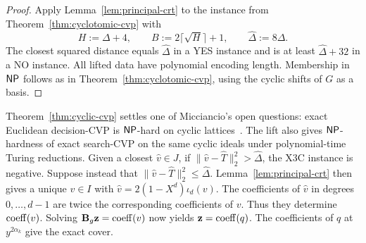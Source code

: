 \begin{proof}
Apply Lemma~\ref{lem:principal-crt} to the instance from
Theorem~\ref{thm:cyclotomic-cvp} with
\[
 H:=\Delta+4,
 \qquad
 B:=2\lceil\sqrt H\rceil+1,
 \qquad
 \widehat\Delta:=8\Delta.
\]
The closest squared distance equals \(\widehat\Delta\) in a YES instance and
is at least \(\widehat\Delta+32\) in a NO instance.  All lifted data have
polynomial encoding length.
Membership in \(\mathsf{NP}\) follows as in
Theorem~\ref{thm:cyclotomic-cvp}, using the cyclic shifts of \(G\) as a
basis.
\end{proof}

\begin{remark}
Theorem~\ref{thm:cyclic-cvp} settles one of Micciancio's open questions:
exact Euclidean decision-CVP is \(\mathsf{NP}\)-hard on cyclic
lattices~\cite{Micciancio2007}.
The lift also gives \(\mathsf{NP}\)-hardness of
exact search-CVP on the same cyclic ideals under polynomial-time Turing
reductions.  Given a closest \(\widehat v\in J\), if
\(\|\widehat v-\widehat T\|_2^2>\widehat\Delta\), the X3C instance is
negative.  Suppose instead that
\(\|\widehat v-\widehat T\|_2^2\leq\widehat\Delta\).
Lemma~\ref{lem:principal-crt} then gives a unique \(v\in I\) with
\(\widehat v=2(1-X^d)\iota_d(v)\). The coefficients of \(\widehat v\) in
degrees \(0,\ldots,d-1\) are twice the corresponding coefficients of \(v\).
Thus they determine \(\operatorname{coeff}(v)\). Solving
\(\mathbf B_g\mathbf z=\operatorname{coeff}(v)\) now yields
\(\mathbf z=\operatorname{coeff}(q)\). The coefficients of \(q\) at
\(y^{2\alpha_k}\) give the exact cover.
\end{remark}
